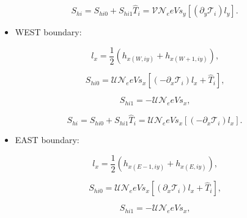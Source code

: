 \documentclass[11pt]{article}
\begin{document}
\begin{equation}
S_{hi}=S_{hi0}+S_{hi1}\widehat{T}_{i}=\mathcal{VN}_{e}eVs_{y}\left[ \left(
\partial_{y}\mathcal{T}_{i}\right) l_{y}\right] \text{.}   \label{c239}
\end{equation}

\bigskip

\begin{itemize}
\item  WEST boundary:
\end{itemize}

\bigskip

\begin{equation}
l_{x}=\frac{1}{2}\left( h_{x\left( W,iy\right) }+h_{x\left( W+1,iy\right)
}\right) \text{,}   \label{c240a}
\end{equation}

\begin{equation}
S_{hi0}=\mathcal{UN}_{e}eVs_{x}\left[ \left( -\partial_{x}\mathcal{T}%
_{i}\right) l_{x}+\widehat{T}_{i}\right] \text{,}   \label{c240}
\end{equation}

\begin{equation}
S_{hi1}=-\mathcal{UN}_{e}eVs_{x}\text{,}   \label{c241}
\end{equation}

\begin{equation}
S_{hi}=S_{hi0}+S_{hi1}\widehat{T}_{i}=\mathcal{UN}_{e}eVs_{x}\left[ \left(
-\partial_{x}\mathcal{T}_{i}\right) l_{x}\right] \text{.}   \label{c242}
\end{equation}

\bigskip

\begin{itemize}
\item  EAST boundary:
\end{itemize}

\bigskip

\begin{equation}
l_{x}=\frac{1}{2}\left( h_{x\left( E-1,iy\right) }+h_{x\left( E,iy\right)
}\right) \text{,}   \label{c243a}
\end{equation}

\begin{equation}
S_{hi0}=\mathcal{UN}_{e}eVs_{x}\left[ \left( \partial_{x}\mathcal{T}%
_{i}\right) l_{x}+\widehat{T}_{i}\right] \text{,}   \label{c243}
\end{equation}

\begin{equation}
S_{hi1}=-\mathcal{UN}_{e}eVs_{x}\text{,}   \label{c244}
\end{equation}
\end{document}
